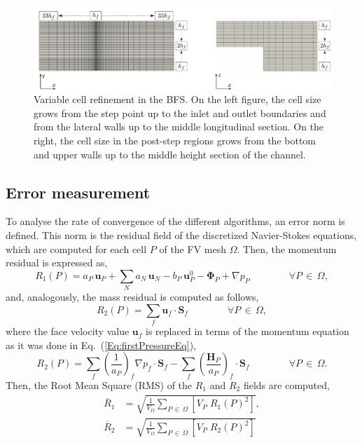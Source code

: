 \documentclass[final,3p,times,11pt,onecolumn]{myElsarticle}
\numberwithin{equation}{section}
\begin{document}
\begin{figure}[t!!!]
\centering
\includegraphics[width=16cm]{fig/Cases/Factores.pdf}
\caption{Variable cell refinement in the BFS.  On the left figure, the cell size grows from the step point up to the inlet and outlet boundaries and from the lateral walls up to the middle longitudinal section. On the right, the cell size in the post-step regions grows from the bottom and upper walls up to the middle height section of the channel.}
\label{Fig:Factores}
\end{figure}

\subsection{Error measurement}
To analyse the rate of convergence of the different algorithms, an error norm is defined. This norm is the residual field of the discretized Navier-Stokes equations, which are computed for each cell $P$ of the FV mesh $\Omega$. Then, the momentum residual is expressed as,
\begin{equation}
\label{Eq:R1Discretized}
R_1(P)
=
a_P\,\boldsymbol{u}_P + \sum_{N} a_{N}\,\boldsymbol{u}_{N} 
-b_P\, \boldsymbol{u}^0_P - \boldsymbol{\Phi}_P + \nabla p_P
\qquad \qquad \forall P\,\in\,\Omega,
\end{equation}
and, analogously, the mass residual is computed as follows,
\begin{equation}
R_2(P)
=
\sum_f
\boldsymbol{u}_f
\cdot
\boldsymbol{S}_f
\qquad \qquad
\forall P\,\in\,\Omega,
\end{equation}
where the face velocity value $\boldsymbol{u}_f$ is replaced in terms of the momentum equation as it was done in Eq.~(\ref{Eq:firstPressureEq}),
\begin{equation}
\label{Eq:R2Discretized}
R_2(P)
=
\sum_f 
\left(
\frac{1}{a_P}
\right)_f 
\nabla p_f
\cdot
\boldsymbol{S}_f 
-
\sum_f
\left(
\frac{\boldsymbol{H}_P}
{a_P}
\right)_f 
\cdot 
\boldsymbol{S}_f
\qquad \qquad
\forall P\,\in\,\Omega.
\end{equation}
Then, the Root Mean Square (RMS) of the $R_1$ and $R_2$ fields are computed, 
\begin{align}
\overline{R}_1
&=
\sqrt
{
\frac{1}{V_\Omega}
\sum_{P\,\in\,\Omega}
\left[V_P\;R_1(P)^2\right]
},
\\
\overline{R}_2
&=
\sqrt
{
\frac{1}{V_\Omega}
\sum_{P\,\in\,\Omega}
\left[V_P\;R_2(P)^2\right]
}
\end{align}
\end{document}
